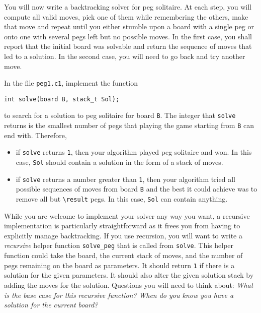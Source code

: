 \documentclass[12pt]{exam}
\begin{document}
\medskip

You will now write a backtracking solver for peg solitaire.  At each
step, you will compute all valid moves, pick one of them while
remembering the others, make that move and repeat until you either
stumble upon a board with a single peg or onto one with several pegs
left but no possible moves.  In the first case, you shall report that
the initial board was solvable and return the sequence of moves that
led to a solution.  In the second case, you will need to go back and
try another move.

\begin{task}[8]
In the file \lstinline'peg1.c1', implement the function
\begin{lstlisting}
int solve(board B, stack_t Sol);
\end{lstlisting}
to search for a solution to peg solitaire for board \lstinline'B'.
The integer that \lstinline'solve' returns is the smallest number of
pegs that playing the game starting from \lstinline'B' can end with.
Therefore,
\begin{itemize}
\item%
  if \lstinline'solve' returns \lstinline'1', then your algorithm
  played peg solitaire and won.  In this case, \lstinline'Sol' should
  contain a solution in the form of a stack of moves.
\item%
  if \lstinline'solve' returns a number greater than \lstinline'1',
  then your algorithm tried all possible sequences of moves from board
  \lstinline'B' and the best it could achieve was to remove all but
  \lstinline'\result' pegs.  In this case, \lstinline'Sol' can contain
  anything.
\end{itemize}
\end{task}

While you are welcome to implement your solver any way you want, a
recursive implementation is particularly straightforward as it frees
you from having to explicitly manage backtracking.  If you use
recursion, you will want to write a \emph{recursive} helper function
\lstinline'solve_peg' that is called from \lstinline'solve'.  This
helper function could take the board, the current stack of moves, and
the number of pegs remaining on the board as parameters.  It should
return \lstinline"1" if there is a solution for the given
parameters. It should also alter the given solution stack by adding
the moves for the solution.  Questions you will need to think about:
\emph{What is the base case for this recursive function?}
\emph{When do you know you have a solution for the current board?}
\end{document}
